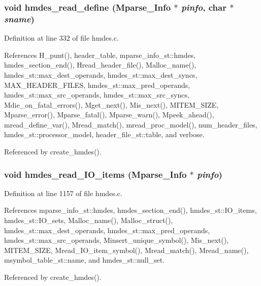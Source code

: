 \subsubsection{\setlength{\rightskip}{0pt plus 5cm}void hmdes\_\-read\_\-define (\bf{Mparse\_\-Info} $\ast$ {\em pinfo}, char $\ast$ {\em sname})}\label{hmdes_8h_a3f0d60b373219c49efda8d55324f992}




Definition at line 332 of file hmdes.c.

References H\_\-punt(), header\_\-table, mparse\_\-info\_\-st::hmdes, hmdes\_\-section\_\-end(), Hread\_\-header\_\-file(), Malloc\_\-name(), hmdes\_\-st::max\_\-dest\_\-operands, hmdes\_\-st::max\_\-dest\_\-syncs, MAX\_\-HEADER\_\-FILES, hmdes\_\-st::max\_\-pred\_\-operands, hmdes\_\-st::max\_\-src\_\-operands, hmdes\_\-st::max\_\-src\_\-syncs, Mdie\_\-on\_\-fatal\_\-errors(), Mget\_\-next(), Mis\_\-next(), MITEM\_\-SIZE, Mparse\_\-error(), Mparse\_\-fatal(), Mparse\_\-warn(), Mpeek\_\-ahead(), mread\_\-define\_\-var(), Mread\_\-match(), mread\_\-proc\_\-model(), num\_\-header\_\-files, hmdes\_\-st::processor\_\-model, header\_\-file\_\-st::table, and verbose.

Referenced by create\_\-hmdes().
\subsubsection{\setlength{\rightskip}{0pt plus 5cm}void hmdes\_\-read\_\-IO\_\-items (\bf{Mparse\_\-Info} $\ast$ {\em pinfo})}\label{hmdes_8h_f5c6d475d646d0b90cc6f70e003c9bb8}




Definition at line 1157 of file hmdes.c.

References mparse\_\-info\_\-st::hmdes, hmdes\_\-section\_\-end(), hmdes\_\-st::IO\_\-items, hmdes\_\-st::IO\_\-sets, Malloc\_\-name(), Malloc\_\-struct(), hmdes\_\-st::max\_\-dest\_\-operands, hmdes\_\-st::max\_\-pred\_\-operands, hmdes\_\-st::max\_\-src\_\-operands, Minsert\_\-unique\_\-symbol(), Mis\_\-next(), MITEM\_\-SIZE, Mread\_\-IO\_\-item\_\-symbol(), Mread\_\-match(), Mread\_\-name(), msymbol\_\-table\_\-st::name, and hmdes\_\-st::null\_\-set.

Referenced by create\_\-hmdes().
